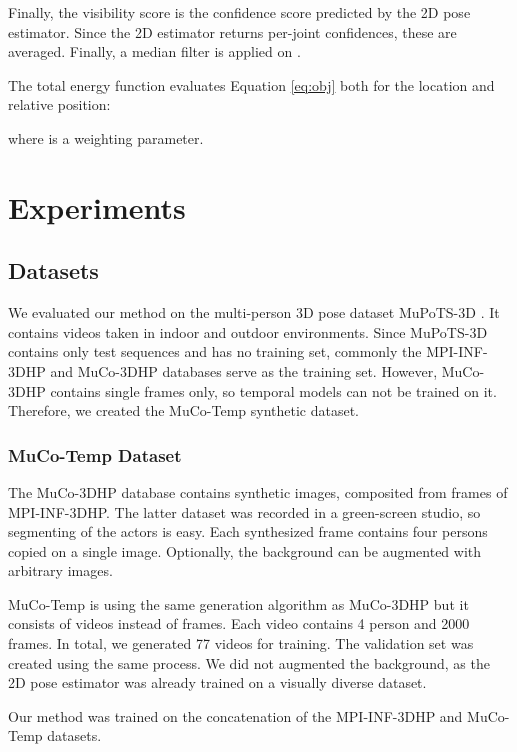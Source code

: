 \documentclass[runningheads, envcountsame, a4paper]{llncs}
\begin{document}
Finally, the visibility score  is the confidence score predicted by the 2D pose estimator. Since the 2D estimator returns per-joint confidences, these are averaged. Finally, a median filter is applied on .

The total energy function evaluates Equation \eqref{eq:obj} both for the location and relative position:

where  is a weighting parameter.


\section{Experiments}
\subsection{Datasets}
We evaluated our method on the multi-person 3D pose dataset MuPoTS-3D \cite{mehta2018single_shot}. It contains videos taken in indoor and outdoor environments. Since MuPoTS-3D contains only test sequences and has no training set, commonly the MPI-INF-3DHP \cite{mehta} and MuCo-3DHP \cite{mehta2018single_shot} databases serve as the training set. However, MuCo-3DHP contains single frames only, so temporal models can not be trained on it. Therefore, we created the MuCo-Temp synthetic dataset.

\subsubsection{MuCo-Temp Dataset}
The MuCo-3DHP database contains synthetic images, composited from frames of  MPI-INF-3DHP. The latter dataset was recorded in a green-screen studio, so segmenting of the actors is easy. Each synthesized frame contains four persons copied on a single image. Optionally, the background can be augmented with arbitrary images.

MuCo-Temp is using the same generation algorithm as MuCo-3DHP but it consists of videos instead of frames. Each video contains 4 person and 2000 frames. In total, we generated  77 videos for training. The validation set was created using the same process. We did not augmented the background, as the 2D pose estimator was already trained on a visually diverse dataset.

Our method was trained on the concatenation of the MPI-INF-3DHP and MuCo-Temp datasets. 
\end{document}
